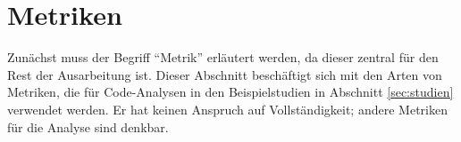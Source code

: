\section{Metriken}
\label{sec:metriken}
Zunächst muss der Begriff "`Metrik"' erläutert werden, da dieser zentral für den Rest der Ausarbeitung ist.
Dieser Abschnitt beschäftigt sich mit den Arten von Metriken, die für Code-Analysen in den Beispielstudien in Abschnitt \ref{sec:studien} verwendet werden.
Er hat keinen Anspruch auf Vollständigkeit; andere Metriken für die Analyse sind denkbar.
